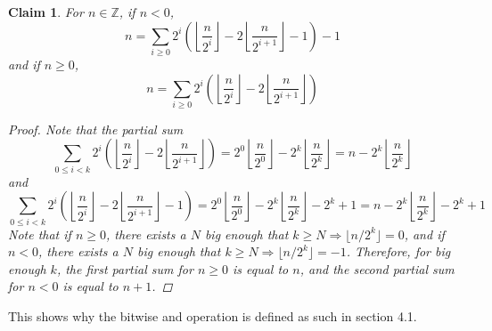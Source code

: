 \documentclass[fleqn]{article}
\newtheorem{clm}{Claim}
\theoremstyle{definition}
\begin{document}
\begin{clm}
  For $n\in\mathbb{Z}$, if $n<0$,
  \[
    n=\sum_{i\ge 0}2^{i}\left(\left\lfloor\frac{n}{2^{i}}\right\rfloor-2\left\lfloor\frac{n}{2^{i+1}}\right\rfloor-1\right)-1
  \]
  and if $n\ge 0$,
   \[
    n=\sum_{i\ge 0}2^{i}\left(\left\lfloor\frac{n}{2^{i}}\right\rfloor-2\left\lfloor\frac{n}{2^{i+1}}\right\rfloor\right)
  \]
  \begin{proof}
    Note that the partial sum
    \[
      \sum_{0\le i<k}2^{i}\left(\left\lfloor\frac{n}{2^{i}}\right\rfloor-2\left\lfloor\frac{n}{2^{i+1}}\right\rfloor\right)=2^{0}\left\lfloor\frac{n}{2^{0}}\right\rfloor-2^{k}\left\lfloor\frac{n}{2^{k}}\right\rfloor = n-2^{k}\left\lfloor\frac{n}{2^{k}}\right\rfloor
    \]
    and
    \[
      \sum_{0\le i<k}2^{i}\left(\left\lfloor\frac{n}{2^{i}}\right\rfloor-2\left\lfloor\frac{n}{2^{i+1}}\right\rfloor-1\right)=2^{0}\left\lfloor\frac{n}{2^{0}}\right\rfloor-2^{k}\left\lfloor\frac{n}{2^{k}}\right\rfloor-2^{k}+1 = n-2^{k}\left\lfloor\frac{n}{2^{k}}\right\rfloor-2^{k}+1
    \]
    Note that if $n\ge 0$, there exists a $N$ big enough that $k\ge N\Rightarrow \lfloor n/2^{k}\rfloor=0$, and if $n<0$, there exists a $N$ big enough that $k\ge N\Rightarrow \lfloor n/2^{k}\rfloor=-1$. Therefore, for big enough $k$, the first partial sum for $n\ge 0$ is equal to $n$, and the second partial sum for $n <0$ is equal to $n+1$.
  \end{proof}
\end{clm}
This shows why the bitwise and operation is defined as such in section 4.1.
\end{document}
